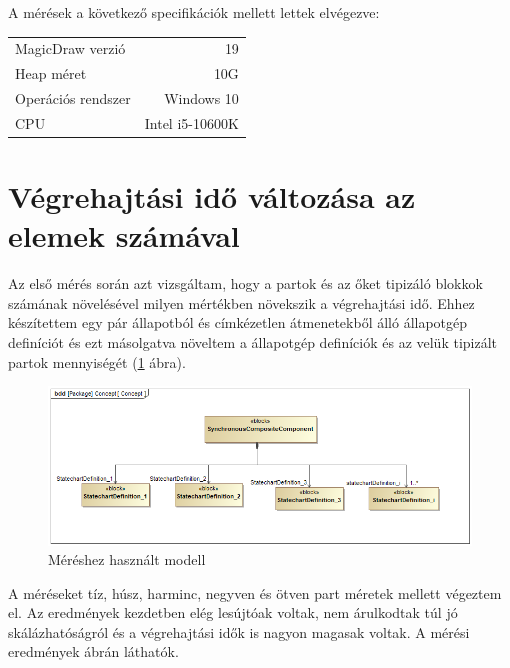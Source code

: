 A mérések a következő specifikációk mellett lettek elvégezve:
\begin{center}
	\begin{tabular}{ l r }
MagicDraw verzió & 19 \\
Heap méret & 10G \\
Operációs rendszer & Windows 10\\
CPU & Intel i5-10600K\\
	\end{tabular}
\end{center}

\section{Végrehajtási idő változása az elemek számával}

Az első mérés során azt vizsgáltam, hogy a partok és az őket tipizáló blokkok számának növelésével milyen mértékben növekszik a végrehajtási idő. Ehhez készítettem egy pár állapotból és címkézetlen átmenetekből álló állapotgép definíciót és ezt másolgatva növeltem a állapotgép definíciók és az velük tipizált partok mennyiségét (\ref{fig:part_mes1} ábra).

\begin{figure}[!ht]
	\centering
	\includegraphics[width=12cm, keepaspectratio]{figures/evaluation/part_mes.png}
	\caption{Méréshez használt modell}
	\label{fig:part_mes1}
\end{figure}

A méréseket tíz, húsz, harminc, negyven és ötven part méretek mellett végeztem el. Az eredmények kezdetben elég lesújtóak voltak, nem árulkodtak túl jó skálázhatóságról és a végrehajtási idők is nagyon magasak voltak. A mérési eredmények  ábrán láthatók.



